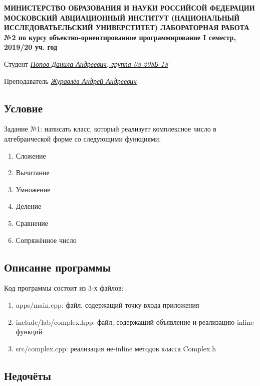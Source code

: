 \documentclass[12pt]{article}
\begin{document}
\begin{titlepage}
\begin{center}
\textbf{МИНИСТЕРСТВО ОБРАЗОВАНИЯ И НАУКИ РОССИЙСОЙ ФЕДЕРАЦИИ
\medskip
МОСКОВСКИЙ АВЦИАЦИОННЫЙ ИНСТИТУТ
(НАЦИОНАЛЬНЫЙ ИССЛЕДОВАТЬЕЛЬСКИЙ УНИВЕРСТИТЕТ)
\vfill\vfill
{\Huge ЛАБОРАТОРНАЯ РАБОТА №2} 
по курсу объектно-ориентированное программирование
I семестр, 2019/20 уч. год}
\end{center}
\vfill

Студент \uline{\it {Попов Данила Андреевич, группа 08-208Б-18}\hfill}

Преподаватель \uline{\it {Журавлёв Андрей Андреевич}\hfill}

\vfill
\end{titlepage}

\subsection*{Условие}

Задание №1: написать класс, который реализует комплексное число в алгебраической форме со следующими функциями: 
\begin{enumerate}
\item Сложение
\item Вычитание
\item Умножение 
\item Деление
\item Сравнение
\item Сопряжённое число
\end{enumerate}

\subsection*{Описание программы}

Код программы состоит из 3-х файлов:
\begin{enumerate}
\item apps/main.cpp: файл, содержащий точку входа приложения
\item include/lab/complex.hpp: файл, содержащий объявление и реализацию inline-функций
\item src/complex.cpp: реализация не-inline методов класса Complex.h
\end{enumerate}

\subsection*{Недочёты}
\end{document}
